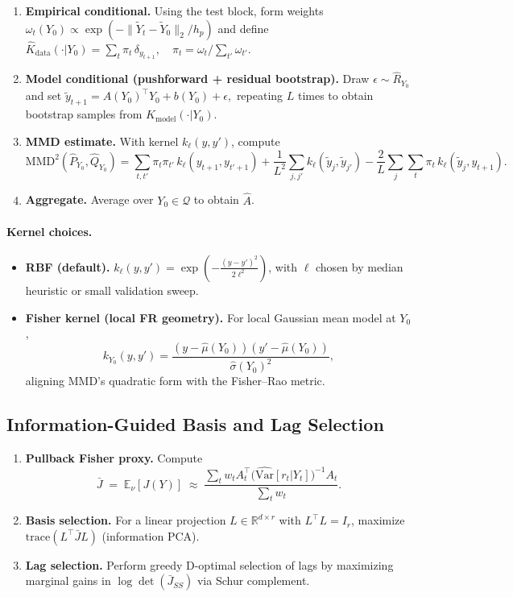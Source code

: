 \documentclass[11pt]{article}
\newcommand{\1}{\mathbf{1}}
\begin{document}
\begin{enumerate}
    \item \textbf{Empirical conditional.} Using the test block, form weights 
    \( \omega_t(Y_0) \propto \exp(-\|\widetilde Y_t-\widetilde Y_0\|_2/h_p) \)
    and define
    \(
      \widehat K_{\mathrm{data}}(\cdot|Y_0) = \sum_t \pi_t \,\delta_{y_{t+1}},\quad
      \pi_t = \omega_t / \sum_{t'} \omega_{t'}.
    \)

    \item \textbf{Model conditional (pushforward + residual bootstrap).} Draw $\epsilon \sim \widehat R_{Y_0}$ and set
    \(
      \tilde y_{t+1} = A(Y_0)^\top Y_0 + b(Y_0) + \epsilon,
    \)
    repeating $L$ times to obtain bootstrap samples from $\widehat K_{\mathrm{model}}(\cdot|Y_0)$.

    \item \textbf{MMD estimate.} With kernel $k_\ell(y,y')$, compute
    \[
    \mathrm{MMD}^2(\widehat P_{Y_0},\widehat Q_{Y_0})
    = \sum_{t,t'}\pi_t\pi_{t'}\,k_\ell(y_{t+1},y_{t'+1})
    + \frac{1}{L^2}\sum_{j,j'} k_\ell(\tilde y_j,\tilde y_{j'})
    - \frac{2}{L}\sum_{j}\sum_t \pi_t\,k_\ell(\tilde y_j,y_{t+1}).
    \]
    \item \textbf{Aggregate.} Average over $Y_0\in\mathcal Q$ to obtain $\widehat A$.
\end{enumerate}

\paragraph{Kernel choices.}
\begin{itemize}
  \item \textbf{RBF (default).} $k_\ell(y,y')=\exp(-\tfrac{(y-y')^2}{2\ell^2})$, with $\ell$ chosen by median heuristic or small validation sweep.
  \item \textbf{Fisher kernel (local FR geometry).} For local Gaussian mean model at $Y_0$,
  \[
    k_{Y_0}(y,y') = \frac{(y-\widehat\mu(Y_0))(y'-\widehat\mu(Y_0))}{\widehat\sigma(Y_0)^2},
  \]
  aligning MMD’s quadratic form with the Fisher–Rao metric.
\end{itemize}

\subsection{Information-Guided Basis and Lag Selection}
\begin{enumerate}
    \item \textbf{Pullback Fisher proxy.} Compute
    \[
        \bar{J} \;=\; \mathbb{E}_\nu[J(Y)] 
        \;\approx\; \frac{\sum_t w_t A_t^\top \big(\widehat{\mathrm{Var}}[r_t|Y_t]\big)^{-1} A_t}{\sum_t w_t}.
    \]
    \item \textbf{Basis selection.} For a linear projection $L \in \mathbb{R}^{d\times r}$ with $L^\top L = I_r$, maximize $\mathrm{trace}(L^\top \bar J L)$ (information PCA).
    \item \textbf{Lag selection.} Perform greedy D-optimal selection of lags by maximizing marginal gains in $\log \det (\bar J_{SS})$ via Schur complement.
\end{enumerate}
\end{document}
